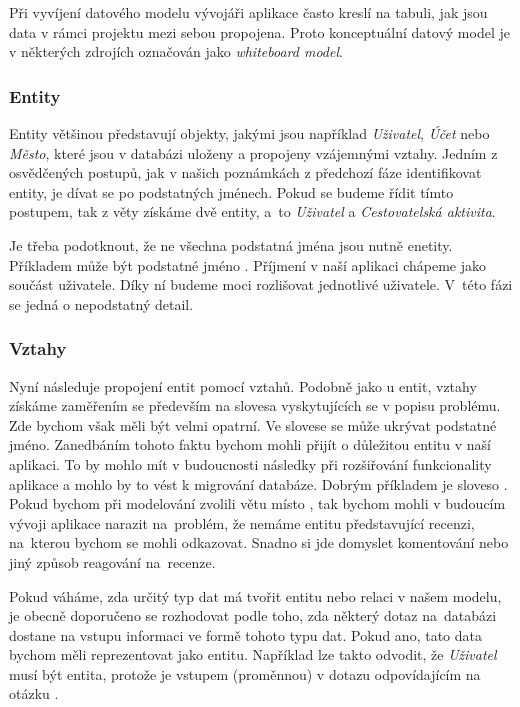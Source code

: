 \documentclass[
  program=infoi,
  biblatex=true,
  figures=true,
  glossaries=false,
  index,
  sourcecodes=true
]{kidiplom}
\begin{document}
Při vyvíjení datového modelu vývojáři aplikace často kreslí na tabuli, jak jsou data v rámci projektu mezi sebou propojena. Proto konceptuální datový model je v některých zdrojích označován jako \textit{whiteboard model}. 

\subsubsection{Entity}
Entity většinou představují objekty, jakými jsou například \textit{Uživatel}, \textit{Účet} nebo \textit{Město}, které jsou v databázi uloženy a propojeny vzájemnými vztahy. Jedním z osvědčených postupů, jak v našich poznámkách z předchozí fáze identifikovat entity, je dívat se po podstatných jménech. Pokud se budeme řídit tímto postupem, tak z věty  získáme dvě entity, a~to \textit{Uživatel} a \textit{Cestovatelská aktivita}.

Je třeba podotknout, že ne všechna podstatná jména jsou nutně enetity. Příkladem může být podstatné jméno . Příjmení v naší aplikaci chápeme jako součást uživatele. Díky ní budeme moci rozlišovat jednotlivé uživatele. V~této fázi se jedná o nepodstatný detail.

\subsubsection{Vztahy}
Nyní následuje propojení entit pomocí vztahů. Podobně jako u entit, vztahy získáme zaměřením se především na slovesa vyskytujících se v popisu problému. Zde bychom však měli být velmi opatrní. Ve slovese se může ukrývat podstatné jméno. Zanedbáním tohoto faktu bychom mohli přijít o důležitou entitu v naší aplikaci. To by mohlo mít v budoucnosti následky při rozšiřování funkcionality aplikace a mohlo by to vést k migrování databáze. Dobrým příkladem je sloveso . Pokud bychom při modelování zvolili větu  místo , tak bychom mohli v budoucím vývoji aplikace narazit na~problém, že nemáme entitu představující recenzi, na~kterou bychom se mohli odkazovat. Snadno si jde domyslet komentování nebo jiný způsob reagování na~recenze.

Pokud váháme, zda určitý typ dat má tvořit entitu nebo relaci v našem modelu, je obecně doporučeno se rozhodovat podle toho, zda některý dotaz na~databázi dostane na vstupu informaci ve formě tohoto typu dat. Pokud ano, tato data bychom měli reprezentovat jako entitu. Například lze takto odvodit, že \textit{Uživatel} musí být entita, protože je vstupem (proměnnou) v dotazu odpovídajícím na otázku .
\end{document}
